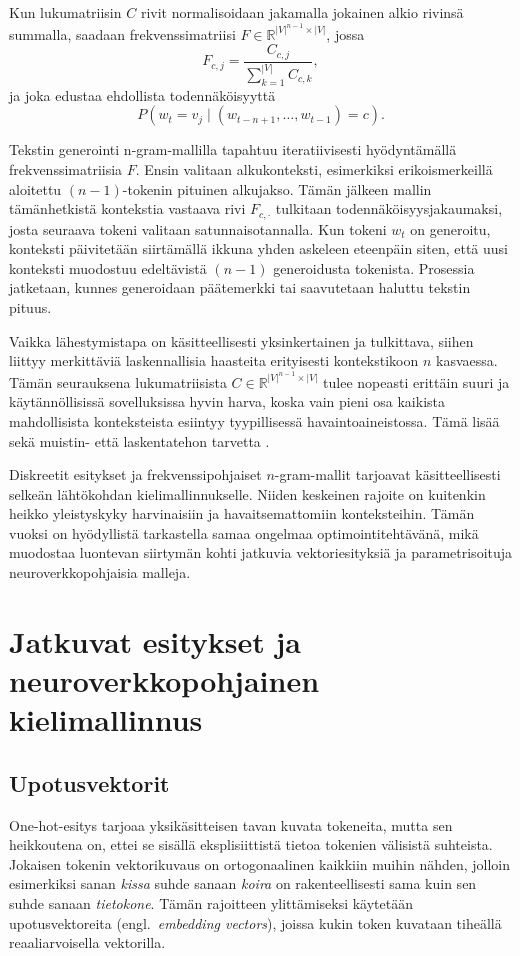 Kun lukumatriisin \(C\) rivit normalisoidaan jakamalla jokainen alkio rivinsä
summalla, saadaan frekvenssimatriisi
\(F \in \mathbb{R}^{|V|^{n-1} \times |V|}\), jossa
\[
  F_{c,j}
  =
  \frac{C_{c,j}}{\sum_{k=1}^{|V|} C_{c,k}},
\]
ja joka edustaa ehdollista todennäköisyyttä
\[
  P(w_t = v_j \mid (w_{t-n+1}, \ldots, w_{t-1}) = c).
\]

Tekstin generointi n-gram-mallilla tapahtuu iteratiivisesti hyödyntämällä
frekvenssimatriisia \(F\). Ensin valitaan alkukonteksti, esimerkiksi
erikoismerkeillä aloitettu \((n-1)\)-tokenin pituinen alkujakso. Tämän jälkeen
mallin tämänhetkistä kontekstia vastaava rivi \(F_{c,\cdot}\) tulkitaan
todennäköisyysjakaumaksi, josta seuraava tokeni valitaan satunnaisotannalla.
Kun tokeni \(w_t\) on generoitu, konteksti päivitetään siirtämällä ikkuna yhden
askeleen eteenpäin siten, että uusi konteksti muodostuu edeltävistä
\((n-1)\) generoidusta tokenista. Prosessia jatketaan, kunnes generoidaan
päätemerkki tai saavutetaan haluttu tekstin pituus.

Vaikka lähestymistapa on käsitteellisesti yksinkertainen ja tulkittava, siihen
liittyy merkittäviä laskennallisia haasteita erityisesti kontekstikoon \(n\)
kasvaessa. Tämän seurauksena lukumatriisista
\(C \in \mathbb{R}^{|V|^{n-1} \times |V|}\) tulee nopeasti erittäin suuri ja
käytännöllisissä sovelluksissa hyvin harva, koska vain pieni osa kaikista
mahdollisista konteksteista esiintyy tyypillisessä havaintoaineistossa. Tämä
lisää sekä muistin- että laskentatehon tarvetta
\cite{jurafsky2023speech}.

Diskreetit esitykset ja frekvenssipohjaiset \(n\)-gram-mallit tarjoavat
käsitteellisesti selkeän lähtökohdan kielimallinnukselle. Niiden keskeinen
rajoite on kuitenkin heikko yleistyskyky harvinaisiin ja havaitsemattomiin
konteksteihin. Tämän vuoksi on hyödyllistä tarkastella samaa ongelmaa
optimointitehtävänä, mikä muodostaa luontevan siirtymän kohti jatkuvia
vektoriesityksiä ja parametrisoituja neuroverkkopohjaisia malleja.

\section{Jatkuvat esitykset ja neuroverkkopohjainen kielimallinnus}

\subsection{Upotusvektorit}

One-hot-esitys tarjoaa yksikäsitteisen tavan kuvata tokeneita, mutta sen
heikkoutena on, ettei se sisällä eksplisiittistä tietoa tokenien välisistä
suhteista. Jokaisen tokenin vektorikuvaus on ortogonaalinen kaikkiin muihin
nähden, jolloin esimerkiksi sanan \emph{kissa} suhde sanaan \emph{koira} on
rakenteellisesti sama kuin sen suhde sanaan \emph{tietokone}. Tämän rajoitteen
ylittämiseksi käytetään upotusvektoreita (engl.\ \emph{embedding vectors}),
joissa kukin token kuvataan tiheällä reaaliarvoisella vektorilla.


